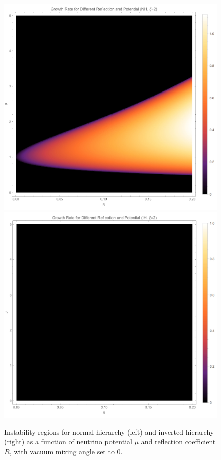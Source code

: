 \begin{figure}[htbp]
    \includegraphics[width=\textwidth]{chapters/assets/halo/growth-rate-mu-refl-nh.jpg}
    \endminipage\hfill
    \includegraphics[width=\textwidth]{chapters/assets/halo/growth-rate-mu-refl-ih.jpg}
    \endminipage\hfill
    \caption{Instability regions for normal hierarchy (left) and inverted hierarchy (right) as a function of neutrino potential $\mu$ and reflection coefficient $R$, with vacuum mixing angle set to 0.}
    \label{chap:halo-sec:line-sym-fig:instability-regions}
\end{figure}




